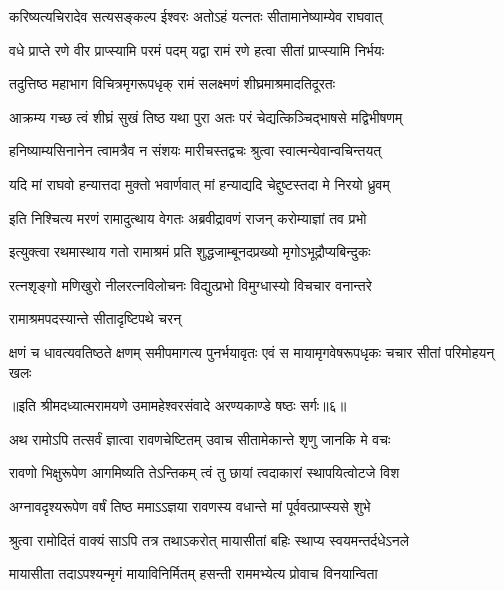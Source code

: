 \twolineshloka
{करिष्यत्यचिरादेव सत्यसङ्कल्प ईश्वरः}
{अतोऽहं यत्नतः सीतामानेष्याम्येव राघवात्} %

\twolineshloka
{वधे प्राप्ते रणे वीर प्राप्स्यामि परमं पदम्}
{यद्वा रामं रणे हत्वा सीतां प्राप्स्यामि निर्भयः} %

\twolineshloka
{तदुत्तिष्ठ महाभाग विचित्रमृगरूपधृक्}
{रामं सलक्ष्मणं शीघ्रमाश्रमादतिदूरतः} %

\twolineshloka
{आक्रम्य गच्छ त्वं शीघ्रं सुखं तिष्ठ यथा पुरा}
{अतः परं चेद्यत्किञ्चिद्भाषसे मद्विभीषणम्} %

\twolineshloka
{हनिष्याम्यसिनानेन त्वामत्रैव न संशयः}
{मारीचस्तद्वचः श्रुत्वा स्वात्मन्येवान्वचिन्तयत्} %

\twolineshloka
{यदि मां राघवो हन्यात्तदा मुक्तो भवार्णवात्}
{मां हन्याद्यदि चेद्दुष्टस्तदा मे निरयो ध्रुवम्} %

\twolineshloka
{इति निश्चित्य मरणं रामादुत्थाय वेगतः}
{अब्रवीद्रावणं राजन् करोम्याज्ञां तव प्रभो} %

\twolineshloka
{इत्युक्त्वा रथमास्थाय गतो रामाश्रमं प्रति}
{शुद्धजाम्बूनदप्रख्यो मृगोऽभूद्रौप्यबिन्दुकः} %

\twolineshloka
{रत्नशृङ्गो मणिखुरो नीलरत्नविलोचनः}
{विद्युत्प्रभो विमुग्धास्यो विचचार वनान्तरे} %

\onelineshloka
{रामाश्रमपदस्यान्ते सीतादृष्टिपथे चरन्} %


\fourlineindentedshloka
{क्षणं च धावत्यवतिष्ठते क्षणम्}
{समीपमागत्य पुनर्भयावृतः}
{एवं स मायामृगवेषरूपधृकः}
{चचार सीतां परिमोहयन् खलः} %

{॥इति श्रीमदध्यात्मरामयणे उमामहेश्वरसंवादे
अरण्यकाण्डे षष्ठः सर्गः॥६॥
}





\twolineshloka
{अथ रामोऽपि तत्सर्वं ज्ञात्वा रावणचेष्टितम्}
{उवाच सीतामेकान्ते शृणु जानकि मे वचः} %

\twolineshloka
{रावणो भिक्षुरूपेण आगमिष्यति तेऽन्तिकम्}
{त्वं तु छायां त्वदाकारां स्थापयित्वोटजे विश} %

\twolineshloka
{अग्नावदृश्यरूपेण वर्षं तिष्ठ ममाऽऽज्ञया}
{रावणस्य वधान्ते मां पूर्ववत्प्राप्स्यसे शुभे} %

\twolineshloka
{श्रुत्वा रामोदितं वाक्यं साऽपि तत्र तथाऽकरोत्}
{मायासीतां बहिः स्थाप्य स्वयमन्तर्दधेऽनले} %

\twolineshloka
{मायासीता तदाऽपश्यन्मृगं मायाविनिर्मितम्}
{हसन्ती राममभ्येत्य प्रोवाच विनयान्विता} %

